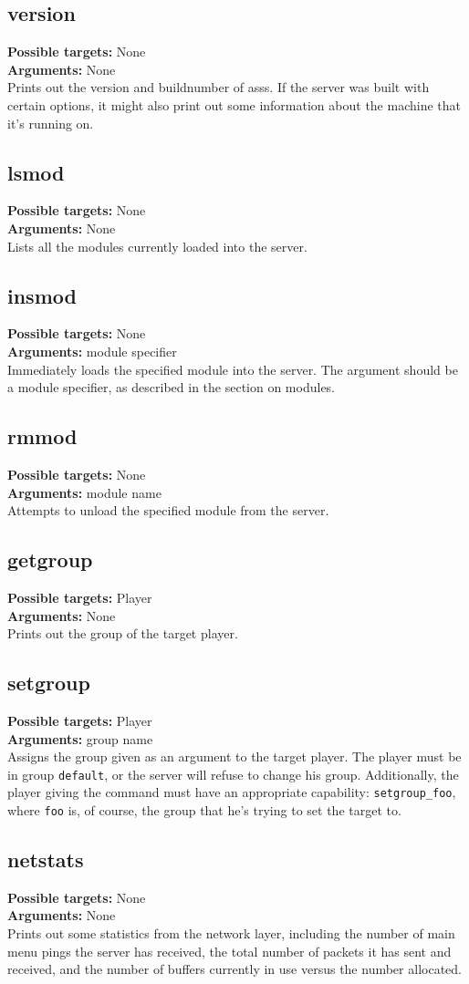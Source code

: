 \documentclass{article}
\newcommand{\targets}[1]{\noindent\textbf{Possible targets:} #1\\}
\newcommand{\args}[1]{\noindent\textbf{Arguments:} #1\\}
\begin{document}
\subsection{version}
\targets{None}
\args{None}
Prints out the version and buildnumber of asss. If the server was built
with certain options, it might also print out some information about the
machine that it's running on.

\subsection{lsmod}
\targets{None}
\args{None}
Lists all the modules currently loaded into the server.

\subsection{insmod}
\targets{None}
\args{module specifier}
Immediately loads the specified module into the server. The argument
should be a module specifier, as described in the section on modules.

\subsection{rmmod}
\targets{None}
\args{module name}
Attempts to unload the specified module from the server.

\subsection{getgroup}
\targets{Player}
\args{None}
Prints out the group of the target player.

\subsection{setgroup}
\targets{Player}
\args{group name}
Assigns the group given as an argument to the target player. The player
must be in group \verb/default/, or the server will refuse to change his
group. Additionally, the player giving the command must have an
appropriate capability: \verb/setgroup_foo/, where \verb/foo/ is, of
course, the group that he's trying to set the target to.

\subsection{netstats}
\targets{None}
\args{None}
Prints out some statistics from the network layer, including the number
of main menu pings the server has received, the total number of packets
it has sent and received, and the number of buffers currently in use
versus the number allocated.
\end{document}
